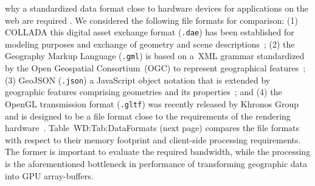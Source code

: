       why a standardized data format close to hardware devices for applications on the
      web are required \cite{Coughlin2014,Trevett2012}. We considered the following file
      formats for comparison: (1) COLLADA this digital
      asset exchange format (\texttt{.dae}) has been established for modeling purposes
      and exchange of geometry and scene descriptions~\cite{Barnes2008}; (2) the Geography
      Markup Language (\texttt{.gml}) is based on a~XML grammar standardized by the Open
      Geospatial Consortium~(OGC) to represent geographical features~\cite{GML2007}; (3)
      GeoJSON (\texttt{.json}) a JavaScript object notation that is extended by geographic
      features comprising geometries and its properties~\cite{Butler2008}; and (4) the
      OpenGL transmission format (\texttt{.gltf}) was recently released by Khronos Group
      and is designed to be a file format close to the requirements of the rendering
      hardware~\cite{Cozzi2015}. Table~{WD:Tab:DataFormats} (next page) compares
      the file formats with respect to their memory footprint and client-side processing
      requirements. The former is important to evaluate the required bandwidth, while
      the processing is the aforementioned bottleneck in performance of transforming
      geographic data into GPU array-buffers.

